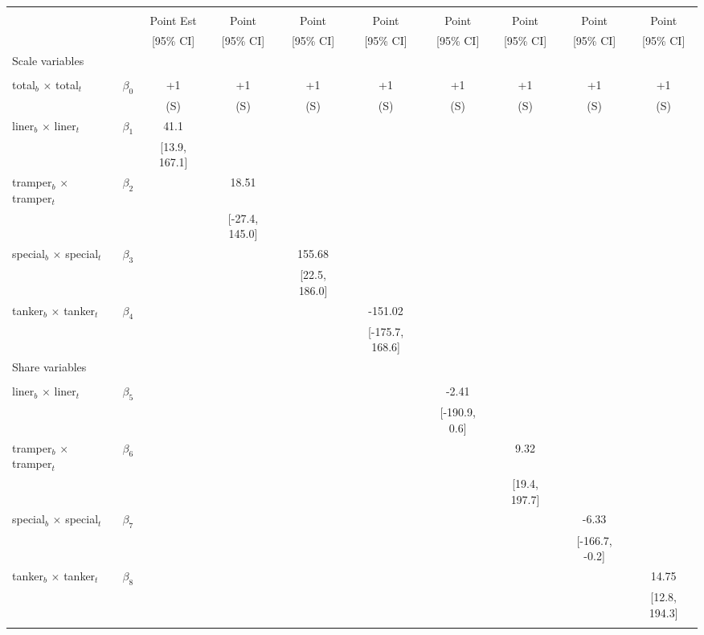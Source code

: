 \begin{tabular}{@{\extracolsep{5pt}}lccccccccc}
\toprule 
 &  &  &  &  &  &  &  &  &  \\
 &  & Point Est & Point & Point & Point & Point & Point & Point & Point \\
 &  & [95\% CI] & [95\% CI] & [95\% CI] & [95\% CI] & [95\% CI] & [95\% CI] & [95\% CI] & [95\% CI] \\
\midrule 
Scale variables &  &  &  &  &  &  &  \\
 &  &  &  &  &  &  &  &  \\
total$_{b}$ $\times$ total$_{t}$ & $\beta_0$ & +1 & +1 & +1 & +1 & +1 & +1 & +1 & +1 \\
 &  & (S) & (S) & (S) & (S) & (S) & (S) & (S) & (S) \\
liner$_{b}$ $\times$ liner$_{t}$ & $\beta_1$ & 41.1 &  &  &  &  &  &  &  \\
 &  & [13.9, 167.1] &  &  &  &  &  &  &  \\
tramper$_{b}$ $\times$ tramper$_{t}$ & $\beta_2$ &  & 18.51 &  &  &  &  &  &  \\
 &  &  & [-27.4, 145.0] &  &  &  &  &  &  \\
special$_{b}$ $\times$ special$_{t}$ & $\beta_3$ &  &  & 155.68 &  &  &  &  &  \\
 &  &  &  & [22.5, 186.0] &  &  &  &  &  \\
tanker$_{b}$ $\times$ tanker$_{t}$ & $\beta_4$ &  &  &  & -151.02 &  &  &  &  \\
 &  &  &  &  & [-175.7, 168.6] &  &  &  &  \\
Share variables &  &  &  &  &  &  &  &  &  \\
 &  &  &  &  &  &  &  &  &  \\
liner$_{b}$ $\times$ liner$_{t}$ & $\beta_5$ &  &  &  &  & -2.41 &  &  &  \\
 &  &  &  &  &  & [-190.9, 0.6] &  &  &  \\
tramper$_{b}$ $\times$ tramper$_{t}$ & $\beta_6$ &  &  &  &  &  & 9.32 &  &  \\
 &  &  &  &  &  &  & [19.4, 197.7] &  &  \\
special$_{b}$ $\times$ special$_{t}$ & $\beta_7$ &  &  &  &  &  &  & -6.33 &  \\
 &  &  &  &  &  &  &  & [-166.7, -0.2] &  \\
tanker$_{b}$ $\times$ tanker$_{t}$ & $\beta_8$ &  &  &  &  &  &  &  & 14.75 \\
 &  &  &  &  &  &  &  &  & [12.8, 194.3] \\
 &  &  &  &  &  &  &  &  &  \\

\end{tabular}
